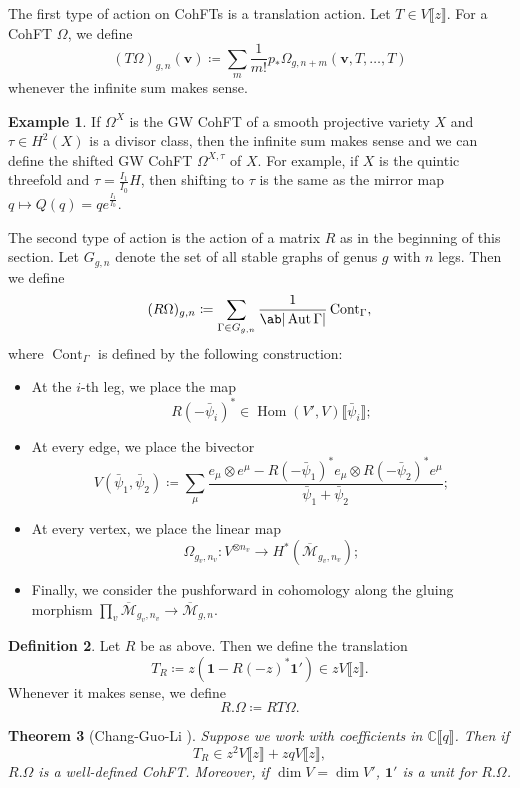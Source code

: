 \documentclass{amsart}
\newtheorem{thm}{Theorem}[section]
\theoremstyle{definition}
\newtheorem{defn}[thm]{Definition}
\newtheorem{exm}[thm]{Example}
\theoremstyle{remark}
\theoremstyle{plain}
\theoremstyle{definition}
\theoremstyle{remark}
\newcommand{\C}{\mathbb{C}}
\newcommand{\Mbar}{\overline{\mathcal{M}}}
\newcommand{\mbf}[1]{\mathbf{#1}}
\newcommand{\bv}{\mbf{v}}
\newcommand{\on}[1]{\operatorname{#1}}
\newcommand{\1}{\mathbf{1}}
\newcommand{\2}{\mathbf{2}}
\newcommand{\3}{\mathbf{3}}
\newcommand{\ps}[1]{\llbracket #1 \rrbracket}
\DeclareMathOperator{\Hom}{Hom}
\DeclareMathOperator{\Aut}{Aut}
\begin{document}
The first type of action on CohFTs is a translation action. Let $T \in V\ps{z}$. For a CohFT $\Omega$, we define
\[ (T\Omega)_{g,n}(\bv) \coloneqq \sum_m \frac{1}{m!} p_* \Omega_{g,n+m}(\bv, T,\ldots,T) \]
whenever the infinite sum makes sense.

\begin{exm}
    If $\Omega^X$ is the GW CohFT of a smooth projective variety $X$ and $\tau \in H^2(X)$ is a divisor class, then the infinite sum makes sense and we can define the shifted GW CohFT $\Omega^{X,\tau}$ of $X$. For example, if $X$ is the quintic threefold and $\tau = \frac{I_1}{I_0} H$, then shifting to $\tau$ is the same as the mirror map $q \mapsto Q(q) = q e^{\frac{I_1}{I_0}}$.
\end{exm}

The second type of action is the action of a matrix $R$ as in the beginning of this section. Let $G_{g,n}$ denote the set of all stable graphs of genus $g$ with $n$ legs. Then we define
\[ (R\Omega)_{g,n} \coloneqq \sum_{\Gamma \in G_{g,n}} \frac{1}{\ab|\Aut \Gamma|} \on{Cont}_{\Gamma}, \]
where $\on{Cont}_{\Gamma}$ is defined by the following construction:
\begin{itemize}
    \item At the $i$-th leg, we place the map 
        \[ R(-\bar{\psi}_i)^* \in \Hom(V',V) \ps{\bar{\psi}_i}; \]
    \item At every edge, we place the bivector
        \[ V(\bar{\psi}_1, \bar{\psi}_2) \coloneqq \sum_{\mu} \frac{e_{\mu} \otimes e^{\mu} - R(-\bar{\psi}_1)^* e_{\mu} \otimes R(-\bar{\psi}_2)^* e^{\mu}}{\bar{\psi}_1 + \bar{\psi}_2}; \]
    \item At every vertex, we place the linear map
        \[ \Omega_{g_v, n_v} \colon V^{\otimes n_v} \to H^*(\Mbar_{g_v, n_v}); \]
    \item Finally, we consider the pushforward in cohomology along the gluing morphism $\prod_v \Mbar_{g_v, n_v} \to \Mbar_{g,n}$.
\end{itemize}

\begin{defn}
    Let $R$ be as above. Then we define the translation
    \[ T_R \coloneqq z (\1 - R(-z)^* \1') \in z V\ps{z}. \]
    Whenever it makes sense, we define
    \[ R.\Omega \coloneqq RT\Omega. \]
\end{defn}

\begin{thm}[Chang-Guo-Li {\cite[Theorem~2.7]{CGL2026}}]
    Suppose we work with coefficients in $\C\ps{q}$. Then if
    \[ T_R \in z^2 V \ps{z} + zq V \ps{z}, \]
    $R.\Omega$ is a well-defined CohFT. Moreover, if $\dim V = \dim V'$, $\1'$ is a unit for $R.\Omega$.
\end{thm}
\end{document}
